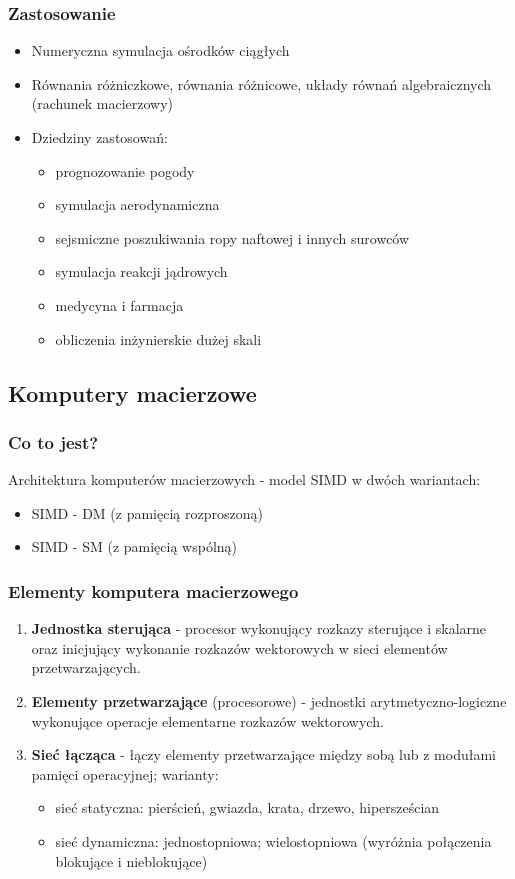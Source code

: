 \documentclass[a4paper,twoside]{article}
\begin{document}
\subsubsection{Zastosowanie}
\begin{itemize}
	\item Numeryczna symulacja ośrodków ciągłych
	\item Równania różniczkowe, równania różnicowe, układy równań algebraicznych (rachunek macierzowy)
	\item Dziedziny zastosowań:
	\begin{itemize}
		\item prognozowanie pogody
		\item symulacja aerodynamiczna
		\item sejsmiczne poszukiwania ropy naftowej i innych surowców
		\item symulacja reakcji jądrowych
		\item medycyna i farmacja
		\item obliczenia inżynierskie dużej skali
	\end{itemize}
\end{itemize}

\subsection{Komputery macierzowe}
\begin{samepage}
	\subsubsection{Co to jest?}
	Architektura komputerów macierzowych - model SIMD w dwóch wariantach:
	\begin{itemize}
		\item SIMD - DM (z pamięcią rozproszoną)
		\item SIMD - SM (z pamięcią wspólną)
	\end{itemize}
	\subsubsection{Elementy komputera macierzowego}
	\begin{enumerate}
		\item \textbf{Jednostka sterująca} - procesor wykonujący rozkazy sterujące i skalarne oraz inicjujący wykonanie rozkazów wektorowych w sieci elementów przetwarzających.
		\item \textbf{Elementy przetwarzające} (procesorowe) - jednostki arytmetyczno-logiczne wykonujące operacje elementarne rozkazów wektorowych.
		\item \textbf{Sieć łącząca} - łączy elementy przetwarzające między sobą lub z modułami pamięci operacyjnej; warianty:
		\begin{itemize}
			\item sieć statyczna: pierścień, gwiazda, krata, drzewo, hipersześcian
			\item sieć dynamiczna: jednostopniowa; wielostopniowa (wyróżnia połączenia blokujące i nieblokujące)
		\end{itemize}
	\end{enumerate}
\end{samepage}
\end{document}

